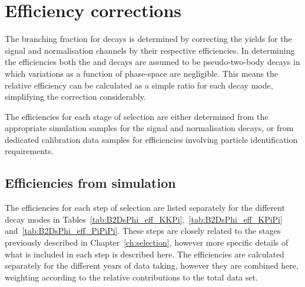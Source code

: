 \section{Efficiency corrections}
\label{sec:B2DsPhi_effcorrections}

The branching fraction for \decay{\Bp}{\Dsp\phiz} decays is determined by correcting the yields for the signal and normalisation channels by their respective efficiencies. In determining the efficiencies both the \decay{\Bp}{\Dsp\phiz} and \decay{\Bp}{\Dsp\Dzb} decays are assumed to be pseudo-two-body decays in which variations as a function of phase-space are negligible. This means the relative efficiency can be calculated as a simple ratio for each \Dsp decay mode, simplifying the correction considerably.    

The efficiencies for each stage of selection are either determined from the appropriate simulation samples for the signal and normalisation decays, or from dedicated calibration data samples for efficiencies involving particle identification requirements. 


\subsection{Efficiencies from simulation}

The efficiencies for each step of selection are listed separately for the different \Dsp decay modes in Tables~\ref{tab:B2DsPhi_eff_KKPi},~\ref{tab:B2DsPhi_eff_KPiPi} and~\ref{tab:B2DsPhi_eff_PiPiPi}. These steps are closely related to the stages previously described in Chapter~\ref{ch:selection}, however more specific details of what is included in each step is described here. The efficiencies are calculated separately for the different years of data taking, however they are combined here, weighting according to the relative contributions to the total data set. 

